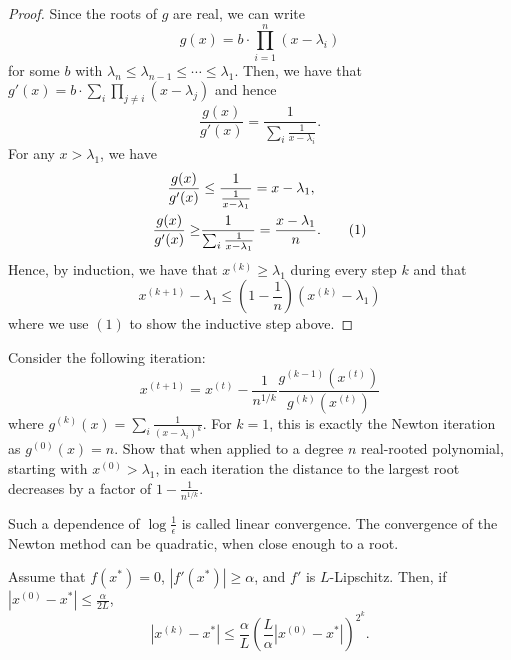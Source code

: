 \begin{proof}
Since the roots of $g$ are real, we can write
\[
g(x)=b\cdot\prod^{n}_{i=1}(x-\lambda_{i})
\]
for some $b$ with $\lambda_{n}\leq\lambda_{n-1}\leq\cdots\leq\lambda_{1}$.
Then, we have that $g'(x)=b\cdot\sum_{i}\prod_{j\neq i}(x-\lambda_{j})$
and hence
\[
\frac{g(x)}{g'(x)}=\frac{1}{\sum_{i}\frac{1}{x-\lambda_{i}}}.
\]
For any $x>\lambda_{1}$, we have 
\begin{align*}
\frac{g(x)}{g'(x)} & \leq\frac{1}{\frac{1}{x-\lambda_{1}}}=x-\lambda_{1},\\
\frac{g(x)}{g'(x)}\geq & \frac{1}{\sum_{i}\frac{1}{x-\lambda_{1}}}=\frac{x-\lambda_{1}}{n}.\tag{{1}}
\end{align*}
Hence, by induction, we have that $x^{(k)}\geq\lambda_{1}$ during
every step $k$ and that
\[
x^{(k+1)}-\lambda_{1}\leq\left(1-\frac{1}{n}\right)(x^{(k)}-\lambda_{1})
\]
where we use $(1)$ to show the inductive step above.
\end{proof}
\begin{xca}
Consider the following iteration: 
\[
x^{(t+1)}=x^{(t)}-\frac{1}{n^{1/k}}\frac{g^{(k-1)}(x^{(t)})}{g^{(k)}(x^{(t)})}
\]
where $g^{(k)}(x)=\sum_{i}\frac{1}{(x-\lambda_{i})^{k}}$. For $k=1$,
this is exactly the Newton iteration as $g^{(0)}(x)=n$. Show that
when applied to a degree $n$ real-rooted polynomial, starting with
$x^{(0)}>\lambda_{1}$, in each iteration the distance to the largest
root decreases by a factor of $1-\frac{1}{n^{1/k}}$.
\end{xca}

Such a dependence of $\log\frac{1}{\epsilon}$ is called linear convergence.
The convergence of the Newton method can be quadratic, when close
enough to a root.
\begin{thm}
Assume that $f(x^{*})=0$, $|f'(x^{*})|\geq\alpha$, and $f'$ is
$L$-Lipschitz. Then, if $|x^{(0)}-x^{*}|\le\frac{\alpha}{2L}$,
\[
|x^{(k)}-x^{*}|\leq\frac{\alpha}{L}\left(\frac{L}{\alpha}|x^{(0)}-x^{*}|\right)^{2^{k}}.
\]
\end{thm}

